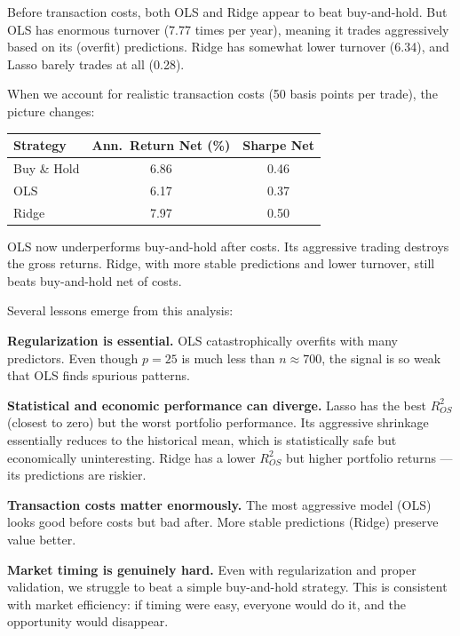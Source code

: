 \documentclass[11pt,a4paper]{article}
\begin{document}
Before transaction costs, both OLS and Ridge appear to beat buy-and-hold. But OLS has enormous turnover (7.77 times per year), meaning it trades aggressively based on its (overfit) predictions. Ridge has somewhat lower turnover (6.34), and Lasso barely trades at all (0.28).

When we account for realistic transaction costs (50 basis points per trade), the picture changes:

\begin{center}
\begin{tabular}{lcc}
\toprule
\textbf{Strategy} & \textbf{Ann.\ Return Net (\%)} & \textbf{Sharpe Net} \\
\midrule
Buy \& Hold & 6.86 & 0.46 \\
OLS & 6.17 & 0.37 \\
Ridge & 7.97 & 0.50 \\
\bottomrule
\end{tabular}
\end{center}

OLS now underperforms buy-and-hold after costs. Its aggressive trading destroys the gross returns. Ridge, with more stable predictions and lower turnover, still beats buy-and-hold net of costs.

Several lessons emerge from this analysis:

\textbf{Regularization is essential.} OLS catastrophically overfits with many predictors. Even though $p = 25$ is much less than $n \approx 700$, the signal is so weak that OLS finds spurious patterns.

\textbf{Statistical and economic performance can diverge.} Lasso has the best $R^2_{OS}$ (closest to zero) but the worst portfolio performance. Its aggressive shrinkage essentially reduces to the historical mean, which is statistically safe but economically uninteresting. Ridge has a lower $R^2_{OS}$ but higher portfolio returns — its predictions are riskier.

\textbf{Transaction costs matter enormously.} The most aggressive model (OLS) looks good before costs but bad after. More stable predictions (Ridge) preserve value better.

\textbf{Market timing is genuinely hard.} Even with regularization and proper validation, we struggle to beat a simple buy-and-hold strategy. This is consistent with market efficiency: if timing were easy, everyone would do it, and the opportunity would disappear.

\end{document}
